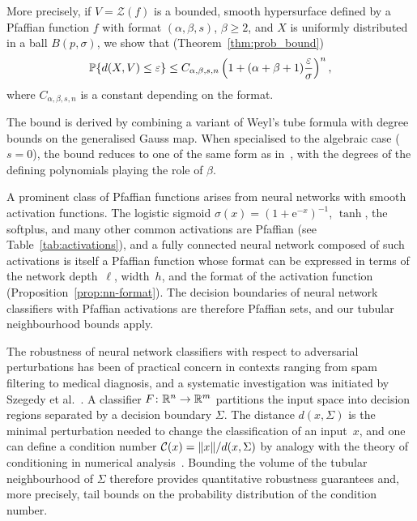 More precisely, if $V = \mathcal{Z}(f)$ is a bounded, smooth hypersurface defined by a Pfaffian function $f$ with format $(\alpha, \beta, s)$, $\beta\geq 2$, and $X$ is uniformly distributed in a ball $B(p,\sigma)$, we show that (Theorem~\ref{thm:prob_bound})
\begin{equation*}
\operatorname*{\mathbb{P}}\{ d(X, V) \le \varepsilon \} \leq C_{\alpha,\beta,s,n}\left(1+(\alpha+\beta+1)\frac{\varepsilon}{\sigma}\right)^n,
\end{equation*}
where 
$C_{\alpha,\beta,s,n}$ is a constant depending on the format.

The bound is derived by combining a variant of Weyl's tube formula with degree bounds on the generalised Gauss map. When specialised to the algebraic case ($s = 0$), the bound reduces to one of the same form as in~\cite{lotz2015volume}, with the degrees of the defining polynomials playing the role of $\beta$.

A prominent class of Pfaffian functions arises from neural networks with smooth activation functions. The logistic sigmoid $\sigma(x)=(1+\mathrm{e}^{-x})^{-1}$, $\tanh$, the softplus, and many other common activations are Pfaffian (see Table~\ref{tab:activations}), and a fully connected neural network composed of such activations is itself a Pfaffian function whose format can be expressed in terms of the network depth~$\ell$, width~$h$, and the format of the activation function (Proposition~\ref{prop:nn-format}). The decision boundaries of neural network classifiers with Pfaffian activations are therefore Pfaffian sets, and our tubular neighbourhood bounds apply.

The robustness of neural network classifiers with respect to adversarial perturbations has been of practical concern in contexts ranging from spam filtering to medical diagnosis, and a systematic investigation was initiated by Szegedy et al.~\cite{szegedy2013intriguing}. A classifier $F\colon \mathbb{R}^n\to \mathbb{R}^m$ partitions the input space into decision regions separated by a decision boundary $\Sigma$. The distance $d(x,\Sigma)$ is the minimal perturbation needed to change the classification of an input~$x$, and one can define a condition number $\mathcal{C}(x) = \|x\|/d(x,\Sigma)$ by analogy with the theory of conditioning in numerical analysis~\cite{burgisser2013condition}. Bounding the volume of the tubular neighbourhood of $\Sigma$ therefore provides quantitative robustness guarantees and, more precisely, tail bounds on the probability distribution of the condition number.

